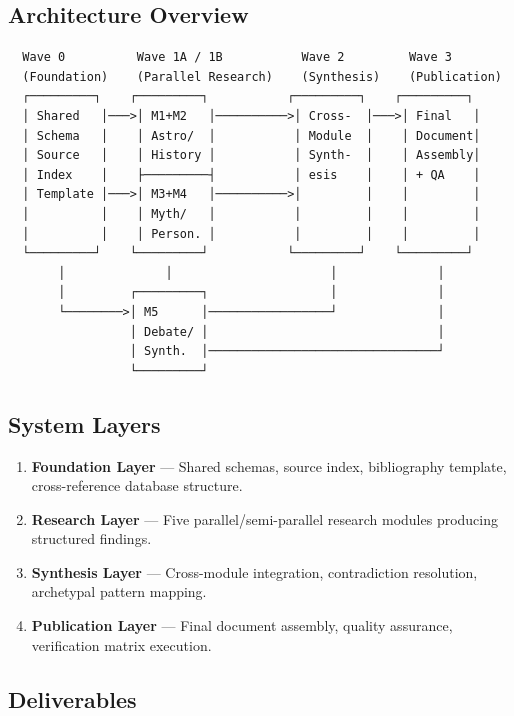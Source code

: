 \documentclass[11pt,letterpaper]{article}
\begin{document}
\subsection{Architecture Overview}

\begin{asciibox}
\begin{verbatim}
  Wave 0          Wave 1A / 1B           Wave 2         Wave 3
  (Foundation)    (Parallel Research)    (Synthesis)    (Publication)
  ┌─────────┐    ┌─────────┐           ┌─────────┐    ┌─────────┐
  │ Shared   │───>│ M1+M2   │──────────>│ Cross-  │───>│ Final   │
  │ Schema   │    │ Astro/  │           │ Module  │    │ Document│
  │ Source   │    │ History │           │ Synth-  │    │ Assembly│
  │ Index    │    ├─────────┤           │ esis    │    │ + QA    │
  │ Template │───>│ M3+M4   │──────────>│         │    │         │
  │          │    │ Myth/   │           │         │    │         │
  │          │    │ Person. │           │         │    │         │
  └─────────┘    └─────────┘           └─────────┘    └─────────┘
       │              │                      │              │
       │         ┌─────────┐                 │              │
       └────────>│ M5      │─────────────────┘              │
                 │ Debate/ │                                │
                 │ Synth.  │────────────────────────────────┘
                 └─────────┘
\end{verbatim}
\end{asciibox}

\subsection{System Layers}

\begin{enumerate}[leftmargin=2em]
\item \textbf{Foundation Layer} --- Shared schemas, source index, bibliography template, cross-reference database structure.
\item \textbf{Research Layer} --- Five parallel/semi-parallel research modules producing structured findings.
\item \textbf{Synthesis Layer} --- Cross-module integration, contradiction resolution, archetypal pattern mapping.
\item \textbf{Publication Layer} --- Final document assembly, quality assurance, verification matrix execution.
\end{enumerate}

\subsection{Deliverables}
\end{document}
